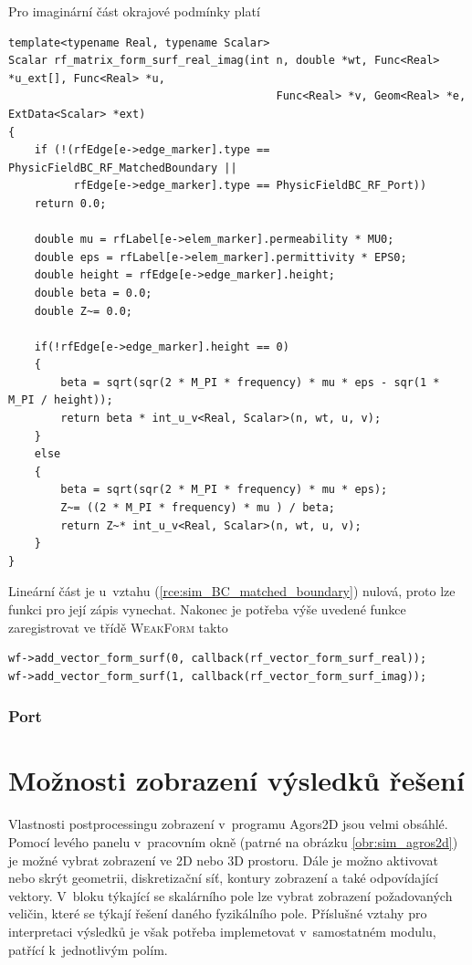 Pro imaginární část okrajové podmínky platí
\begin{verbatim}
template<typename Real, typename Scalar>
Scalar rf_matrix_form_surf_real_imag(int n, double *wt, Func<Real> *u_ext[], Func<Real> *u,
                                         Func<Real> *v, Geom<Real> *e, ExtData<Scalar> *ext)
{
    if (!(rfEdge[e->edge_marker].type == PhysicFieldBC_RF_MatchedBoundary ||
          rfEdge[e->edge_marker].type == PhysicFieldBC_RF_Port))
    return 0.0;

    double mu = rfLabel[e->elem_marker].permeability * MU0;
    double eps = rfLabel[e->elem_marker].permittivity * EPS0;
    double height = rfEdge[e->edge_marker].height;
    double beta = 0.0;
    double Z~= 0.0;

    if(!rfEdge[e->edge_marker].height == 0)
    {
        beta = sqrt(sqr(2 * M_PI * frequency) * mu * eps - sqr(1 * M_PI / height));
        return beta * int_u_v<Real, Scalar>(n, wt, u, v);
    }
    else
    {
        beta = sqrt(sqr(2 * M_PI * frequency) * mu * eps);
        Z~= ((2 * M_PI * frequency) * mu ) / beta;
        return Z~* int_u_v<Real, Scalar>(n, wt, u, v);
    }
}
\end{verbatim}
Lineární část je u~vztahu (\ref{rce:sim_BC_matched_boundary}) nulová, proto lze funkci pro její zápis vynechat.
Nakonec je potřeba výše uvedené funkce zaregistrovat ve třídě \textsc{WeakForm} takto
\begin{verbatim}
wf->add_vector_form_surf(0, callback(rf_vector_form_surf_real));
wf->add_vector_form_surf(1, callback(rf_vector_form_surf_imag));           
\end{verbatim}
                
\subsubsection*{Port}

\section{Možnosti zobrazení výsledků řešení}
Vlastnosti postprocessingu zobrazení v~programu Agors2D jsou velmi obsáhlé. Pomocí levého panelu v~pracovním okně (patrné na obrázku \ref{obr:sim_agros2d}) je možné vybrat zobrazení ve 2D nebo 3D prostoru. Dále je možno aktivovat nebo skrýt geometrii,  diskretizační síť, kontury zobrazení a také odpovídající vektory. V~bloku týkající se skalárního pole lze vybrat zobrazení požadovaných veličin, které se týkají řešení daného fyzikálního pole. Příslušné vztahy pro interpretaci výsledků je však potřeba implemetovat v~samostatném modulu, patřící k~jednotlivým polím.

